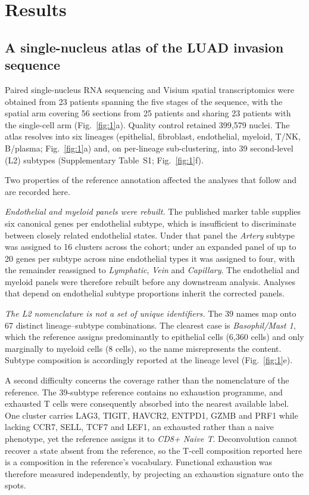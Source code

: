 \section{Results}

\subsection{A single-nucleus atlas of the LUAD invasion sequence}

Paired single-nucleus RNA sequencing and Visium spatial transcriptomics were obtained from
23 patients spanning the five stages of the sequence, with the spatial arm covering 56
sections from 25 patients and sharing 23 patients with the single-cell arm
(Fig.~\ref{fig:1}a). Quality control retained 399,579 nuclei. The atlas resolves into six
lineages (epithelial, fibroblast, endothelial, myeloid, T/NK, B/plasma;
Fig.~\ref{fig:1}a) and, on per-lineage sub-clustering, into 39 second-level (L2) subtypes
(Supplementary Table~S1; Fig.~\ref{fig:1}f).

Two properties of the reference annotation affected the analyses that follow and are
recorded here.

\emph{Endothelial and myeloid panels were rebuilt.} The published marker table supplies six
canonical genes per endothelial subtype, which is insufficient to discriminate between
closely related endothelial states. Under that panel the \emph{Artery} subtype was assigned
to 16 clusters across the cohort; under an expanded panel of up to 20 genes per subtype
across nine endothelial types it was assigned to four, with the remainder reassigned to
\emph{Lymphatic}, \emph{Vein} and \emph{Capillary}. The endothelial and myeloid panels were
therefore rebuilt before any downstream analysis. Analyses that depend on endothelial
subtype proportions inherit the corrected panels.

\emph{The L2 nomenclature is not a set of unique identifiers.} The 39 names map onto 67
distinct lineage--subtype combinations. The clearest case is \emph{Basophil/Mast 1}, which
the reference assigns predominantly to epithelial cells (6,360 cells) and only marginally
to myeloid cells (8 cells), so the name misrepresents the content. Subtype composition is
accordingly reported at the lineage level (Fig.~\ref{fig:1}e).

A second difficulty concerns the coverage rather than the nomenclature of the reference. The
39-subtype reference contains no exhaustion programme, and exhausted T cells were
consequently absorbed into the nearest available label. One cluster carries LAG3, TIGIT,
HAVCR2, ENTPD1, GZMB and PRF1 while lacking CCR7, SELL, TCF7 and LEF1, an exhausted rather
than a naive phenotype, yet the reference assigns it to \emph{CD8+ Naive T}. Deconvolution
cannot recover a state absent from the reference, so the T-cell composition reported here is
a composition in the reference's vocabulary. Functional exhaustion was therefore measured
independently, by projecting an exhaustion signature
\citep{thommen2018,wherry2015exhaustion} onto the spots.

